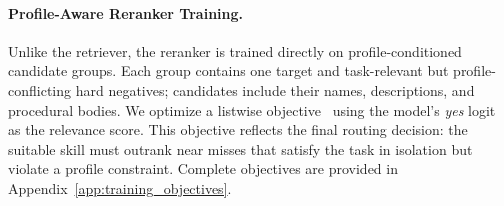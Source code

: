 \documentclass[letterpaper]{article} %
\begin{document}


\paragraph{Profile-Aware Reranker Training.}
Unlike the retriever, the reranker is trained directly on profile-conditioned candidate groups. Each group contains one target and task-relevant but profile-conflicting hard negatives; candidates include their names, descriptions, and procedural bodies. We optimize a listwise objective~\cite{10.1145/1390156.1390306} using the model's \textit{yes} logit as the relevance score. This objective reflects the final routing decision: the suitable skill must outrank near misses that satisfy the task in isolation but violate a profile constraint. Complete objectives are provided in Appendix~\ref{app:training_objectives}.




\end{document}
